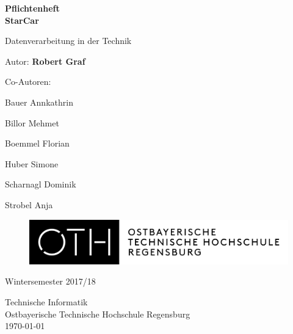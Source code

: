 \begin{titlepage}
    \begin{center}
        \vspace{1cm}
        
        \huge
        \textbf{Pflichtenheft} \\
        \textbf{StarCar}
        
        \vspace{0.5cm}
        \Large
        Datenverarbeitung in der Technik

        \vspace{3cm}

        Autor: \textbf{Robert Graf} \\
        \begin{center}
            Co-Autoren:\\
            \small
                \item Bauer Annkathrin
                \item Billor Mehmet
                \item Boemmel Florian
                \item Huber Simone
                \item Scharnagl Dominik
                \item Strobel Anja
        \end{center}

        \vspace{1.0cm}
        
        \begin{figure}
            \centering
            \includegraphics[width=0.7\linewidth]{OTHLogo.jpg}
            \label{pic:OTHLogo}
        \end{figure}

        \vfill
        
        Wintersemester 2017/18
        
        \vspace{0.8cm}
        \large
        Technische Informatik\\
        Ostbayerische Technische Hochschule Regensburg\\
        \today
    \end{center}
\end{titlepage}
